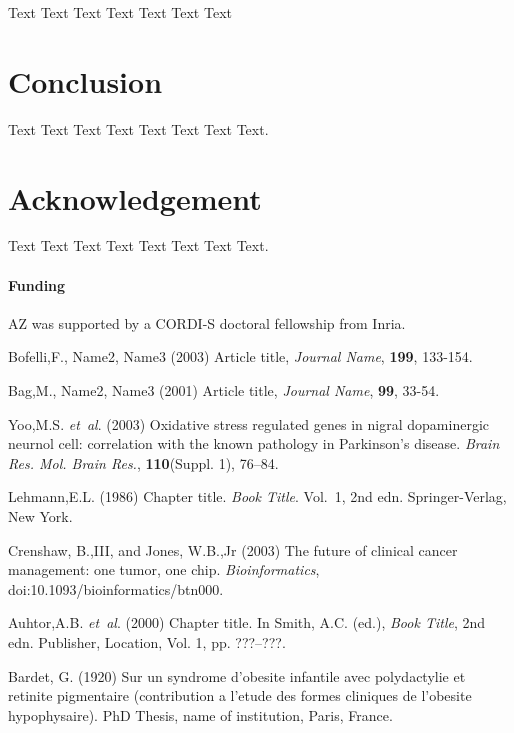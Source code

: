 \documentclass{bioinfo}
\begin{document}
Text Text Text Text Text Text  Text 



\section{Conclusion}
Text Text Text Text Text Text  Text Text.



\section*{Acknowledgement}
Text Text Text Text Text Text  Text Text.

\paragraph{Funding\textcolon} AZ was supported by a CORDI-S doctoral fellowship from Inria.

%
%
%
%
%
%
%
%
%


\begin{thebibliography}{}
 Bofelli,F., Name2, Name3 (2003) Article title, {\it Journal Name}, {\bf 199}, 133-154.

 Bag,M., Name2, Name3 (2001) Article title, {\it Journal Name}, {\bf 99}, 33-54.

Yoo,M.S. \textit{et~al}. (2003) Oxidative stress regulated genes
in nigral dopaminergic neurnol cell: correlation with the known
pathology in Parkinson's disease. \textit{Brain Res. Mol. Brain
Res.}, \textbf{110}(Suppl. 1), 76--84.

Lehmann,E.L. (1986) Chapter title. \textit{Book Title}. Vol.~1, 2nd edn. Springer-Verlag, New York.

Crenshaw, B.,III, and Jones, W.B.,Jr (2003) The future of clinical
cancer management: one tumor, one chip. \textit{Bioinformatics},
doi:10.1093/bioinformatics/btn000.

Auhtor,A.B. \textit{et~al}. (2000) Chapter title. In Smith, A.C.
(ed.), \textit{Book Title}, 2nd edn. Publisher, Location, Vol. 1, pp.
???--???.

Bardet, G. (1920) Sur un syndrome d'obesite infantile avec
polydactylie et retinite pigmentaire (contribution a l'etude des
formes cliniques de l'obesite hypophysaire). PhD Thesis, name of
institution, Paris, France.

\end{thebibliography}
\end{document}
